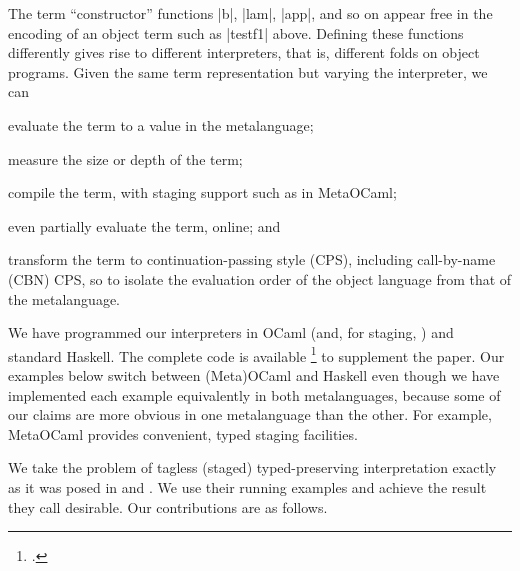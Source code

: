 The term ``constructor'' functions |b|, |lam|, |app|, and so on appear
free in the encoding of an object term such as |testf1| above.  Defining
these functions differently gives rise to different interpreters, that
is, different folds on object programs.  Given the same term
representation but varying the interpreter, we can
\begin{itemize*}
    \item evaluate the term to a value in the metalanguage;
    \item measure the size or depth of the term;
    \item compile the term, with staging support such as in MetaOCaml;
    \item even partially evaluate the term, online; and
    \item transform the term to continuation\hyp passing style (CPS),
        including call-by-name (CBN) CPS, so to isolate the evaluation
        order of the object language from that of the metalanguage.
\end{itemize*}
We have programmed our interpreters in OCaml (and, for staging,
\cite{metaocaml}) and standard Haskell. The complete code is available%
\footnote{.}
to supplement the paper. Our examples below switch between (Meta)OCaml
and Haskell even though we have implemented each example equivalently in
both metalanguages, because some of our claims are more obvious in one
metalanguage than the other.  For example, MetaOCaml provides
convenient, typed staging facilities.

We take the problem of tagless (staged) typed-preserving
interpretation exactly as it was posed in \cite{WalidICFP02} and
\cite{xi-guarded}.  We use their running examples and achieve the
result they call desirable.  Our contributions are as follows.

